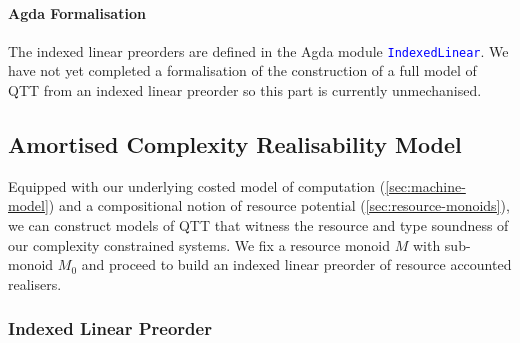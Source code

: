 \documentclass[acmsmall,screen]{acmart}
\newcommand{\AgdaModule}[1]{\textcolor{blue}{\tt #1}}
\begin{document}
\paragraph{Agda Formalisation} The indexed linear preorders are
defined in the Agda module \AgdaModule{IndexedLinear}. We have not yet
completed a formalisation of the construction of a full model of QTT
from an indexed linear preorder so this part is currently unmechanised.

\subsection{Amortised Complexity Realisability Model}
\label{sec:realisability-model}

Equipped with our underlying costed model of computation
(\autoref{sec:machine-model}) and a compositional notion of resource
potential (\autoref{sec:resource-monoids}), we can construct models of
QTT that witness the resource and type soundness of our complexity
constrained systems. We fix a resource monoid $M$ with sub-monoid
$M_0$ and proceed to build an indexed linear preorder of resource
accounted realisers.

\subsubsection{Indexed Linear Preorder}
\label{sec:realisability-indexed-linear-preorder}
\end{document}
